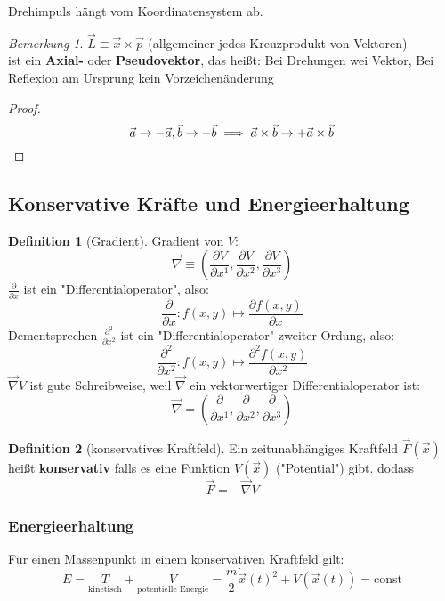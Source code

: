 \documentclass[a4paper]{scrartcl}
\renewcommand{\v}[1]{\vec{#1}}
\theoremstyle{definition}
\newtheorem{defn}{Definition}
\theoremstyle{plain}
\theoremstyle{remark}
\newtheorem{remark}{Bemerkung}
\theoremstyle{remark}
\begin{document}
Drehimpuls hängt vom Koordinatensystem ab.
\begin{remark}
$\v L \equiv \v x\times \v p$ (allgemeiner jedes Kreuzprodukt von Vektoren) \\
ist ein \textbf{Axial-} oder \textbf{Pseudovektor}, das heißt: Bei Drehungen wei Vektor, Bei Reflexion am Ursprung kein Vorzeichenänderung
\begin{proof}
\[\v a \to -\v a, \v b \to -\v b \implies \v a \times \v b \to + \v a \times \v b \qedhere\]
\end{proof}
\end{remark}
\subsection{Konservative Kräfte und Energieerhaltung}
\label{sec-4-3}
\begin{defn}[Gradient]
Gradient von $V$:
\[\v\nabla \equiv \left(\frac{\partial V}{\partial x^1}, \frac{\partial V}{\partial x^2}, \frac{\partial V}{\partial x^3}\right)\]
$\frac{\partial}{\partial x}$ ist ein "Differentialoperator", also:
\[\frac{\partial}{\partial x}:f(x,y)\mapsto \frac{\partial f(x,y)}{\partial x}\]
Dementsprechen $\frac{\partial^2}{\partial x^2}$ ist ein "Differentialoperator" zweiter Ordung, also:
\[\frac{\partial^2}{\partial x^2}:f(x,y)\mapsto \frac{\partial^2 f(x,y)}{\partial x^2}\]
$\v\nabla V$ ist gute Schreibweise, weil $\v\nabla$ ein vektorwertiger Differentialoperator ist:
\[\v\nabla = \left(\frac{\partial}{\partial x^1}, \frac{\partial}{\partial x^2}, \frac{\partial}{\partial x^3}\right)\]
\end{defn}
\begin{defn}[konservatives Kraftfeld]
Ein zeitunabhängiges Kraftfeld $\v F(\v x)$ heißt \textbf{konservativ} falls es eine Funktion $V(\v x)$ ("Potential") gibt. dodass
\[\v F = -\v \nabla V\]
\end{defn}
\subsubsection{Energieerhaltung}
\label{sec-4-3-1}
Für einen Massenpunkt in einem konservativen Kraftfeld gilt:
\[E = \underset{\text{kinetisch}}{T} + \underset{\text{potentielle Energie}}{V} = \frac{m}{2}\dot{\v x}(t)^2 + V(\v x(t)) = \text{const}\]
\end{document}

